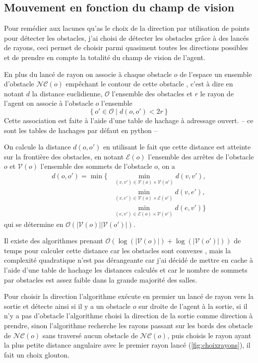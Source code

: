 \documentclass{article}
\newcommand{\bigo}{\mathcal{O}}
\newcommand{\vertices}{\mathcal{V}}
\newcommand{\edges}{\mathcal{E}}
\newcommand{\noncontour}{\mathcal{NC}}
\begin{document}
\subsection{Mouvement en fonction du champ de vision}

Pour remédier aux lacunes qu'as le choix de la direction par utilisation
de points pour détecter les obstacles, j'ai choisi de détecter les obstacles
grâce à des lancés de rayons, ceci permet de choisir parmi quasiment toutes
les directions possibles et de prendre en compte la totalité du champ de
vision de l'agent.

En plus du lancé de rayon on associe à chaque obstacle $o$ de l'espace un
ensemble d'obstacle $\noncontour(o)$ empêchant le contour de cette obstacle ,
c'est à
dire en notant $d$ la distance euclidienne, $\mathcal{O}$
l'ensemble des obstacles et $r$ le rayon de l'agent on associe à
l'obstacle $o$ l'ensemble
\[
  \left\{ o' \in \mathcal{O} \middle| d(o, o') < 2r \right\}
\]
Cette association est faite à l'aide d'une table de hachage à
adressage ouvert. -- ce sont les tables de hachages par défaut
en python --

On calcule la distance $d(o, o')$ en utilisant
le fait que cette distance est atteinte sur la frontière des obstacles,
en notant $\edges(o)$ l'ensemble des arrêtes
de l'obstacle $o$ et $\vertices(o)$ l'ensemble des sommets de
l'obstacle $o$, on a
\begin{align*}
  d(o, o') = \min\biggl\{
    &\min_{(v, v') \in \vertices(o) \times \vertices(o')} d(v, v'), \\
    &\min_{(v, e') \in \vertices(o) \times \edges(o')} d(v, e'), \\
    &\min_{(e, v') \in \edges(o) \times \vertices(o')} d(e, v')\biggr\}
\end{align*}
qui se détermine en $\bigo\left(|\vertices(o)||\vertices(o')|\right)$.

Il existe des algorithmes prenant 
$\bigo\left(\log\left(|\vertices(o)|\right)
  + \log\left(|\vertices(o')|\right)\right)$ 
de temps pour calculer cette distance car les obstacles sont
convexes \cite{YangQiMengLiWang06}, mais la complexité quadratique
n'est pas dérangeante car j'ai décidé de mettre en cache à
l'aide d'une table de hachage les distances calculés et car le nombre
de sommets par obstacles est assez faible dans la grande majorité des
salles.

Pour choisir la direction l'algorithme exécute en premier un lancé de rayon
vers la sortie et détecte ainsi si il y a un obstacle $o$ sur droite de
l'agent à la sortie, si il n'y a pas d'obstacle l'algorithme choisi
la direction de la sortie comme direction à prendre, sinon l'algorithme
recherche les rayons passant sur les bords des obstacle de $\noncontour(o)$
sans traversé aucun obstacle de $\noncontour(o)$, puis choisis le rayon
ayant la plus petite distance angulaire avec le premier rayon lancé
(\autoref{fig:choixrayons}), il fait un choix glouton.
\end{document}
